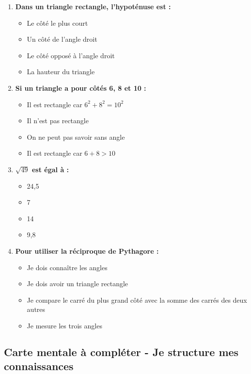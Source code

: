 \begin{enumerate}
	\item \textbf{Dans un triangle rectangle, l'hypoténuse est :}
	\begin{itemize}
		\item[$\square$] Le côté le plus court
		\item[$\square$] Un côté de l'angle droit  
		\item[$\boxtimes$] Le côté opposé à l'angle droit
		\item[$\square$] La hauteur du triangle
	\end{itemize}
	
	\item \textbf{Si un triangle a pour côtés 6, 8 et 10 :}
	\begin{itemize}
		\item[$\boxtimes$] Il est rectangle car $6^2 + 8^2 = 10^2$
		\item[$\square$] Il n'est pas rectangle
		\item[$\square$] On ne peut pas savoir sans angle
		\item[$\square$] Il est rectangle car $6 + 8 > 10$
	\end{itemize}
	
	\item \textbf{$\sqrt{49}$ est égal à :}
	\begin{itemize}
		\item[$\square$] 24,5
		\item[$\boxtimes$] 7
		\item[$\square$] 14
		\item[$\square$] 9,8
	\end{itemize}
	
	\item \textbf{Pour utiliser la réciproque de Pythagore :}
	\begin{itemize}
		\item[$\square$] Je dois connaître les angles
		\item[$\square$] Je dois avoir un triangle rectangle
		\item[$\boxtimes$] Je compare le carré du plus grand côté avec la somme des carrés des deux autres
		\item[$\square$] Je mesure les trois angles
	\end{itemize}
\end{enumerate}

\subsection*{Carte mentale à compléter - Je structure mes connaissances}


